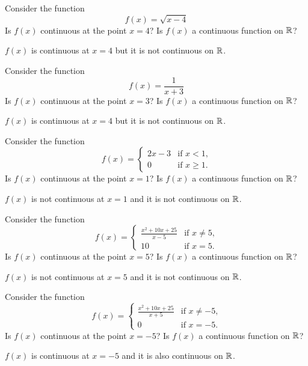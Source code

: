\begin{exercises}

\begin{exercise} 
Consider the function
\[
f(x) = \sqrt{x-4} 
\]
Is $f(x)$ continuous at the point $x=4$?  Is $f(x)$ a continuous
function on $\mathbb{R}$?
\begin{answer}
  $f(x)$ is continuous at $x=4$ but it is not continuous on $\mathbb{R}$.
\end{answer}
\end{exercise}


\begin{exercise} 
Consider the function
\[
f(x) = \frac{1}{x+3}
\]
Is $f(x)$ continuous at the point $x=3$?  Is $f(x)$ a continuous
function on $\mathbb{R}$?
\begin{answer}
  $f(x)$ is continuous at $x=4$ but it is not continuous on $\mathbb{R}$.
\end{answer}
\end{exercise}

\begin{exercise} 
Consider the function
\[
f(x) = 
\begin{cases} 
2x - 3 & \text{if $x<1$,} \\ 
0      & \text{if $x\geq 1$.}
\end{cases}
\]
Is $f(x)$ continuous at the point $x=1$?  Is $f(x)$ a continuous
function on $\mathbb{R}$?
\begin{answer}
  $f(x)$ is not continuous at $x=1$ and it is not continuous on $\mathbb{R}$.
\end{answer}
\end{exercise}



\begin{exercise} 
Consider the function
\[
f(x) = 
\begin{cases} 
\frac{x^2 + 10x + 25}{x-5} & \text{if $x\ne 5$,} \\ 
10      & \text{if $x= 5$.}
\end{cases}
\]
Is $f(x)$ continuous at the point $x=5$?  Is $f(x)$ a continuous
function on $\mathbb{R}$?
\begin{answer}
  $f(x)$ is not continuous at $x=5$ and it is not continuous on $\mathbb{R}$.
\end{answer}
\end{exercise}


\begin{exercise} 
Consider the function
\[
f(x) = 
\begin{cases} 
\frac{x^2 + 10x + 25}{x+5} & \text{if $x\ne -5$,} \\ 
0      & \text{if $x= -5$.}
\end{cases}
\]
Is $f(x)$ continuous at the point $x=-5$?  Is $f(x)$ a continuous
function on $\mathbb{R}$?
\begin{answer}
  $f(x)$ is continuous at $x=-5$ and it is also continuous on $\mathbb{R}$.
\end{answer}
\end{exercise}




\end{exercises}

